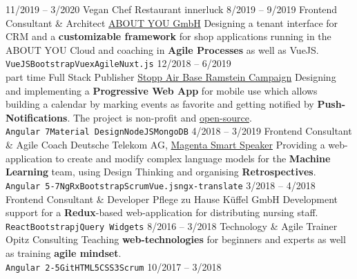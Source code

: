 \documentclass[9pt]{developercv} %
\begin{document}
\begin{entrylist}
  \entry
		{11/2019 -- 3/2020}
		{Vegan Chef}
		{Restaurant innerluck}
    {}
  \entry
		{8/2019 -- 9/2019}
		{Frontend Consultant \& Architect}
		{\href{https://cloud.aboutyou.com/}{ABOUT YOU GmbH}}
    {
      Designing a tenant interface for CRM and a \textbf{customizable framework} for shop applications
      running in the ABOUT YOU Cloud and coaching in \textbf{Agile Processes} as well as VueJS.\\
      \texttt{VueJS}\slashsep\texttt{Bootstrap}\slashsep\texttt{Vuex}\slashsep\texttt{Agile}\slashsep\texttt{Nuxt.js}
    }
	\entry
		{12/2018 -- 6/2019\\\footnotesize{part time}}
		{Full Stack Publisher}
		{\href{https://www.ramstein-kampagne.eu/}{Stopp Air Base Ramstein Campaign}}
    {
      Designing and implementing a \textbf{Progressive Web App} for mobile use which allows building a calendar by
      marking events as favorite and getting notified by \textbf{Push-Notifications}. The project is non-profit and
      \href{https://github.com/frot-io/ramstein-conference-app}{open-source}.\\
      \texttt{Angular 7}\slashsep\texttt{Material Design}\slashsep\texttt{NodeJS}\slashsep\texttt{MongoDB}
    }
  \entry
		{4/2018 -- 3/2019}
		{Frontend Consultant \& Agile Coach}
		{Deutsche Telekom AG, \href{https://www.telekom.de/zuhause/geraete-und-zubehoer/smart-speaker}{Magenta Smart Speaker}}
    {
      Providing a web-application to create and modify complex language models for the
      \textbf{Machine Learning} team, using Design Thinking and organising \textbf{Retrospectives}.\\
      \texttt{Angular 5-7}\slashsep\texttt{NgRx}\slashsep\texttt{Bootstrap}\slashsep\texttt{Scrum}\slashsep\texttt{Vue.js}\slashsep\texttt{ngx-translate}
    }
	\entry
		{3/2018 -- 4/2018}
		{Frontend Consultant \& Developer}
		{Pflege zu Hause Küffel GmbH}
		{
      Development support for a \textbf{Redux}-based web-application for distributing nursing staff.\\
      \texttt{React}\slashsep\texttt{Bootstrap}\slashsep\texttt{jQuery Widgets}
    }
  \entry
		{8/2016 -- 3/2018}
		{Technology \& Agile Trainer}
		{Opitz Consulting}
		{
      Teaching \textbf{web-technologies} for beginners and experts as well as training \textbf{agile mindset}.\\
      \texttt{Angular 2-5}\slashsep\texttt{Git}\slashsep\texttt{HTML5}\slashsep\texttt{CSS3}\slashsep\texttt{Scrum}
    }
  \entry
		{10/2017 -- 3/2018}

\end{entrylist}
\end{document}

